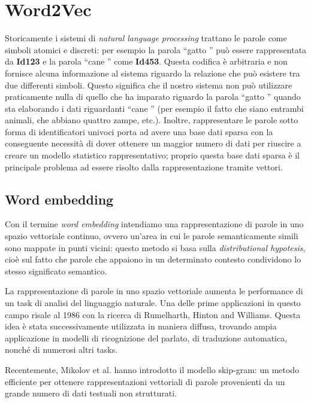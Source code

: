 \documentclass[a4paper,12pt,openright,twoside]{report}
\theoremstyle{definition}
\begin{document}
\section{Word2Vec}
\label{sec:word2vec}
Storicamente i sistemi di \emph{natural language processing} trattano le parole come simboli atomici e discreti:
per esempio la parola ``gatto '' può essere rappresentata da \textbf{Id123} e la parola ``cane '' come \textbf{Id453}.
Questa codifica è arbitraria e non fornisce alcuna informazione al sistema riguardo la relazione
che può esistere tra due differenti simboli.
Questo significa che il nostro sistema non può utilizzare praticamente nulla di quello che ha imparato
riguardo la parola ``gatto '' quando sta elaborando i dati riguardanti ``cane '' (per esempio il fatto che siano
entrambi animali, che abbiano quattro zampe, etc.).
Inoltre, rappresentare le parole sotto forma di identificatori univoci porta ad avere una base dati sparsa
con la conseguente necessità di dover ottenere un maggior numero di dati per riuscire a creare un modello
statistico rappresentativo; proprio questa base dati sparsa è il principale problema 
ad essere risolto dalla rappresentazione tramite vettori.

\subsection{Word embedding}
Con il termine \emph{word embedding} intendiamo una rappresentazione di parole in uno spazio vettoriale 
continuo, ovvero un'area in cui le parole
semanticamente simili sono mappate in punti vicini: questo metodo si basa sulla \emph{distributional hypotesis}, 
cioè sul fatto che parole che appaiono in 
un determinato contesto condividono lo stesso significato semantico.

La rappresentazione di parole in uno spazio vettoriale aumenta le performance
di un task di analisi del linguaggio naturale. Una delle prime
applicazioni in questo campo risale al 1986 con la ricerca di Rumelharth, Hinton and Williams.
Questa idea è stata successivamente utilizzata in maniera diffusa, trovando ampia 
applicazione in modelli di ricognizione del parlato,
di traduzione automatica, nonché di numerosi altri tasks.

Recentemente, Mikolov et al. hanno introdotto il modello skip-gram: 
un metodo efficiente per ottenere
rappresentazioni vettoriali di parole provenienti da un grande numero di dati testuali non strutturati.
\end{document}
